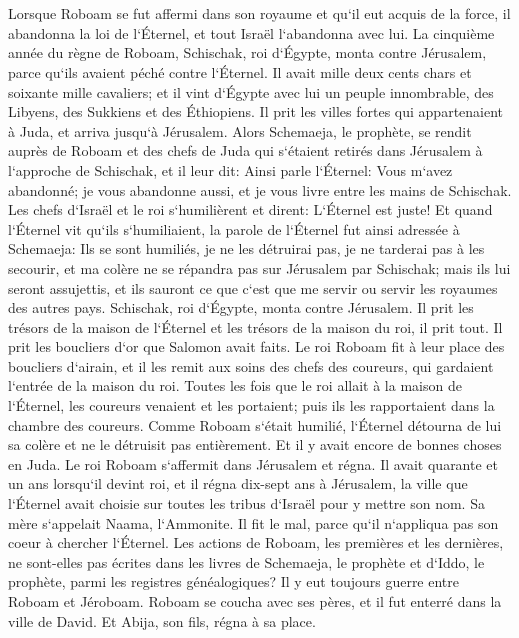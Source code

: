 \chapter{}

\verse Lorsque Roboam se fut affermi dans son royaume et qu`il eut acquis de la force, il abandonna la loi de l`Éternel, et tout Israël l`abandonna avec lui. 
\verse La cinquième année du règne de Roboam, Schischak, roi d`Égypte, monta contre Jérusalem, parce qu`ils avaient péché contre l`Éternel. 
\verse Il avait mille deux cents chars et soixante mille cavaliers; et il vint d`Égypte avec lui un peuple innombrable, des Libyens, des Sukkiens et des Éthiopiens. 
\verse Il prit les villes fortes qui appartenaient à Juda, et arriva jusqu`à Jérusalem. 
\verse Alors Schemaeja, le prophète, se rendit auprès de Roboam et des chefs de Juda qui s`étaient retirés dans Jérusalem à l`approche de Schischak, et il leur dit: Ainsi parle l`Éternel: Vous m`avez abandonné; je vous abandonne aussi, et je vous livre entre les mains de Schischak. 
\verse Les chefs d`Israël et le roi s`humilièrent et dirent: L`Éternel est juste! 
\verse Et quand l`Éternel vit qu`ils s`humiliaient, la parole de l`Éternel fut ainsi adressée à Schemaeja: Ils se sont humiliés, je ne les détruirai pas, je ne tarderai pas à les secourir, et ma colère ne se répandra pas sur Jérusalem par Schischak; 
\verse mais ils lui seront assujettis, et ils sauront ce que c`est que me servir ou servir les royaumes des autres pays. 
\verse Schischak, roi d`Égypte, monta contre Jérusalem. Il prit les trésors de la maison de l`Éternel et les trésors de la maison du roi, il prit tout. Il prit les boucliers d`or que Salomon avait faits. 
\verse Le roi Roboam fit à leur place des boucliers d`airain, et il les remit aux soins des chefs des coureurs, qui gardaient l`entrée de la maison du roi. 
\verse Toutes les fois que le roi allait à la maison de l`Éternel, les coureurs venaient et les portaient; puis ils les rapportaient dans la chambre des coureurs. 
\verse Comme Roboam s`était humilié, l`Éternel détourna de lui sa colère et ne le détruisit pas entièrement. Et il y avait encore de bonnes choses en Juda. 
\verse Le roi Roboam s`affermit dans Jérusalem et régna. Il avait quarante et un ans lorsqu`il devint roi, et il régna dix-sept ans à Jérusalem, la ville que l`Éternel avait choisie sur toutes les tribus d`Israël pour y mettre son nom. Sa mère s`appelait Naama, l`Ammonite. 
\verse Il fit le mal, parce qu`il n`appliqua pas son coeur à chercher l`Éternel. 
\verse Les actions de Roboam, les premières et les dernières, ne sont-elles pas écrites dans les livres de Schemaeja, le prophète et d`Iddo, le prophète, parmi les registres généalogiques? Il y eut toujours guerre entre Roboam et Jéroboam. 
\verse Roboam se coucha avec ses pères, et il fut enterré dans la ville de David. Et Abija, son fils, régna à sa place. 

